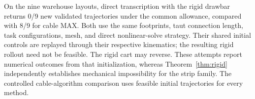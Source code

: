 On the nine warehouse layouts, direct transcription with the rigid drawbar returns 0/9 new validated trajectories under the common allowance, compared with 8/9 for cable MAX. Both use the same footprints, taut connection length, task configurations, mesh, and direct nonlinear-solve strategy. Their shared initial controls are replayed through their respective kinematics; the resulting rigid rollout need not be feasible. The rigid cart may reverse. These attempts report numerical outcomes from that initialization, whereas Theorem~\ref{thm:rigid} independently establishes mechanical impossibility for the strip family. The controlled cable-algorithm comparison uses feasible initial trajectories for every method.
